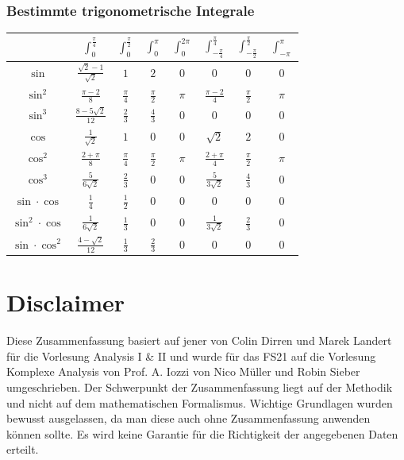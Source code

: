 \documentclass[8pt, a4paper, landscape, fleqn]{scrartcl}
\begin{document}
\begin{multicols*}{3}
				\subsubsection{Bestimmte trigonometrische Integrale}
				    \hspace{10pt}
				    \begin{tabular}{|c|c|c|c|c|c|c|c|}
						\hline
						&$\int_0^{\frac{\pi}{4}}$ &$\int_0^{\frac{\pi}{2}}$ &$\int_0^{\pi}$ &$\int_0^{2\pi}$ &$\int_{-\frac{\pi}{4}}^{\frac{\pi}{4}}$ &$\int_{-\frac{\pi}{2}}^{\frac{\pi}{2}}$ &$\int_{-\pi}^{\pi}$ \\
						\hline
						$\sin$ &$\frac{\sqrt{2}-1}{\sqrt{2}}$ &$1$ &$2$ &$0$ &$0$ &$0$ &$0$\\
						\hline
						$\sin^2$ &$\frac{\pi-2}{8}$ &$\frac{\pi}{4}$ &$\frac{\pi}{2}$ &$\pi$ &$\frac{\pi-2}{4}$ &$\frac{\pi}{2}$ &$\pi$\\
						\hline
						$\sin^3$ &$\frac{8-5\sqrt{2}}{12}$ &$\frac{2}{3}$ &$\frac{4}{3}$ &$0$ &$0$ &$0$ &$0$\\
						\hline
						$\cos$ &$\frac{1}{\sqrt{2}}$ &$1$ &$0$ &$0$ &$\sqrt{2}$ &$2$ &$0$\\
						\hline
						$\cos^2$ &$\frac{2+\pi}{8}$ &$\frac{\pi}{4}$ &$\frac{\pi}{2}$ &$\pi$ &$\frac{2+\pi}{4}$ &$\frac{\pi}{2}$ &$\pi$ \\
						\hline
						$\cos^3$ &$\frac{5}{6\sqrt{2}}$ &$\frac{2}{3}$ &$0$ &$0$ &$\frac{5}{3\sqrt{2}}$ &$\frac{4}{3}$ &$0$\\
						\hline 
						$\sin \cdot \cos$ &$\frac{1}{4}$ &$\frac{1}{2}$ &$0$ &$0$ &$0$ &$0$ &$0$ \\
						\hline 
						$\sin^2 \cdot \cos$&$\frac{1}{6\sqrt{2}}$ &$\frac{1}{3}$ &$0$ &$0$ &$\frac{1}{3\sqrt{2}}$ &$\frac{2}{3}$ &$0$ \\
						\hline 
						$\sin \cdot \cos^2$ &$\frac{4-\sqrt{2}}{12}$ &$\frac{1}{3}$ &$\frac{2}{3}$ &$0$ &$0$ &$0$ &$0$ \\
						\hline 
					\end{tabular}
					\vspace{10pt}
		\section{Disclaimer}
			Diese Zusammenfassung basiert auf jener von Colin Dirren und Marek Landert für die Vorlesung Analysis I \& II und wurde für das FS21 auf die Vorlesung Komplexe Analysis von Prof. A. Iozzi von Nico Müller und Robin Sieber umgeschrieben. Der Schwerpunkt der Zusammenfassung liegt auf der Methodik und nicht auf dem mathematischen Formalismus. Wichtige Grundlagen wurden bewusst ausgelassen, da man diese auch ohne Zusammenfassung anwenden können sollte. Es wird keine Garantie für die Richtigkeit der angegebenen Daten erteilt.

\end{multicols*}
\end{document}
